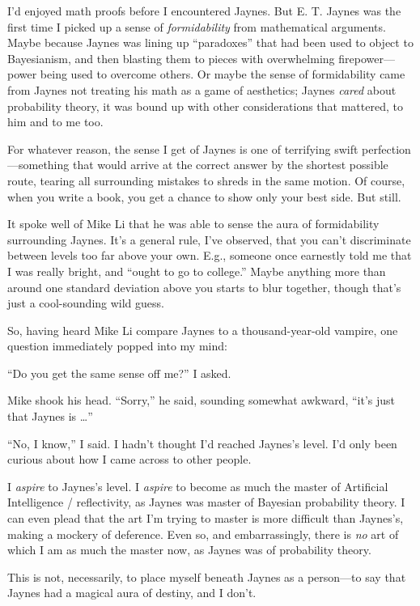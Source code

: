 {
 I'd enjoyed math proofs before I encountered
Jaynes. But E. T. Jaynes was the first time I picked up a sense of
\textit{formidability} from mathematical arguments. Maybe because
Jaynes was lining up ``paradoxes''
that had been used to object to Bayesianism, and then blasting them to
pieces with overwhelming firepower---power being used to overcome
others. Or maybe the sense of formidability came from Jaynes not
treating his math as a game of aesthetics; Jaynes \textit{cared} about
probability theory, it was bound up with other considerations that
mattered, to him and to me too.}

{
 For whatever reason, the sense I get of Jaynes is one of
terrifying swift perfection---something that would arrive at the
correct answer by the shortest possible route, tearing all surrounding
mistakes to shreds in the same motion. Of course, when you write a
book, you get a chance to show only your best side. But still.}

{
 It spoke well of Mike Li that he was able to sense the aura of
formidability surrounding Jaynes. It's a general rule,
I've observed, that you can't
discriminate between levels too far above your own. E.g., someone once
earnestly told me that I was really bright, and
``ought to go to college.'' Maybe
anything more than around one standard deviation above you starts to
blur together, though that's just a cool-sounding wild
guess.}

{
 So, having heard Mike Li compare Jaynes to a thousand-year-old
vampire, one question immediately popped into my mind:}

{
 ``Do you get the same sense off
me?'' I asked.}

{
 Mike shook his head. ``Sorry,''
he said, sounding somewhat awkward,
``it's just that Jaynes is
\ldots''}

{
 ``No, I know,'' I said. I
hadn't thought I'd reached
Jaynes's level. I'd only been curious
about how I came across to other people.}

{
 I \textit{aspire} to Jaynes's level. I
\textit{aspire} to become as much the master of Artificial Intelligence
/ reflectivity, as Jaynes was master of Bayesian probability theory. I
can even plead that the art I'm trying to master is
more difficult than Jaynes's, making a mockery of
deference. Even so, and embarrassingly, there is \textit{no} art of
which I am as much the master now, as Jaynes was of probability
theory.}

{
 This is not, necessarily, to place myself beneath Jaynes as a
person---to say that Jaynes had a magical aura of destiny, and I
don't.}

